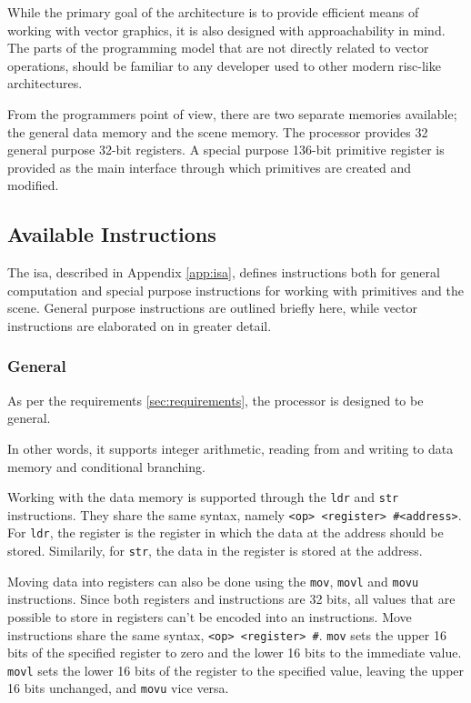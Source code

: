 While the primary goal of the \vthreek architecture is to provide efficient means of working with vector graphics, it is also designed with approachability in mind.
The parts of the programming model that are not directly related to vector operations, should be familiar to any developer used to other modern \gls{risc}-like architectures.

From the programmers point of view, there are two separate memories available; the general data memory and the scene memory.
The processor provides 32 general purpose 32-bit registers.
A special purpose 136-bit primitive register is provided as the main interface through which primitives are created and modified.

\subsection{Available Instructions}

The \vthreek \gls{isa}, described in Appendix \ref{app:isa}, defines instructions both for general computation and special purpose instructions for working with primitives and the scene.
General purpose instructions are outlined briefly here, while vector instructions are elaborated on in greater detail.

\subsubsection{General}

As per the requirements \ref{sec:requirements}, the \vthreek processor is designed to be general.

In other words, it supports integer arithmetic, reading from and writing to data memory and conditional branching.

Working with the data memory is supported through the \texttt{ldr} and \texttt{str} instructions.
They share the same syntax, namely \texttt{<op> <register> \#<address>}.
For \texttt{ldr}, the register is the register in which the data at the address should be stored.
Similarily, for \texttt{str}, the data in the register is stored at the address.

Moving data into registers can also be done using the \texttt{mov}, \texttt{movl} and \texttt{movu} instructions.
Since both registers and instructions are 32 bits, all values that are possible to store in registers can't be encoded into an instructions.
Move instructions share the same syntax, \texttt{<op> <register> \#<16-bit immediate>}.
\texttt{mov} sets the upper 16 bits of the specified register to zero and the lower 16 bits to the immediate value.
\texttt{movl} sets the lower 16 bits of the register to the specified value, leaving the upper 16 bits unchanged, and \texttt{movu} vice versa.

